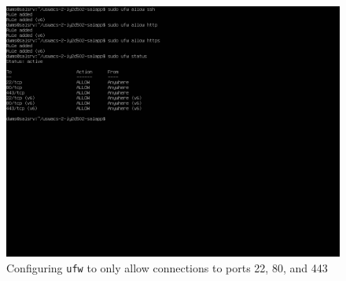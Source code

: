 \pagebreak
\begin{figure}[h!]
\centering
\captionsetup{skip=\skipfigurecaptionlen}
\includegraphics[width=1\textwidth]{screenshots/IY2D502-2019-02-26-19-28-12.png}
\caption{Configuring \texttt{ufw} to only allow connections to ports 22, 80, and 443}
\label{fig:IY2D502-2019-02-26-19-28-12}
\end{figure}
